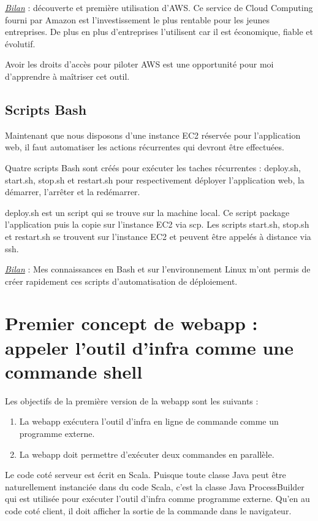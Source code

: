 \underline{\textit{Bilan}} : découverte et première utilisation d'AWS. Ce
service de Cloud Computing fourni par Amazon est l'investissement le plus
rentable pour les jeunes entreprises. De plus en plus d'entreprises l'utilisent
car il est économique, fiable et évolutif.

Avoir les droits d'accès pour piloter AWS est une opportunité pour moi
d'apprendre à maîtriser cet outil.

\subsection{Scripts Bash}

Maintenant que nous disposons d'une instance EC2 réservée pour l'application
web, il faut automatiser les actions récurrentes qui devront être effectuées.

Quatre scripts Bash sont créés pour exécuter les taches récurrentes :
deploy.sh, start.sh, stop.sh et restart.sh pour respectivement déployer
l'application web, la démarrer, l'arrêter et la redémarrer.

deploy.sh est un script qui se trouve sur la machine local.
Ce script package l'application puis la copie sur l'instance EC2 via scp.
Les scripts start.sh, stop.sh et restart.sh se trouvent sur l'instance EC2 et
peuvent être appelés à distance via ssh.

\underline{\textit{Bilan}} : Mes connaissances en Bash et sur l'environnement
Linux m'ont permis de créer rapidement ces scripts d'automatisation de
déploiement.

\section{Premier concept de webapp : appeler l'outil d'infra comme une commande
  shell}
\noindent Les objectifs de la première version de la webapp sont les suivants :
\begin{enumerate}
\item La webapp exécutera l'outil d'infra en ligne de commande comme un
  programme externe.
\item La webapp doit permettre d'exécuter deux commandes en parallèle.
\end{enumerate}

Le code coté serveur est écrit en Scala.
Puisque toute classe Java peut être naturellement instanciée dans du code Scala,
c'est la classe Java ProcessBuilder qui est utilisée pour exécuter
l'outil d'infra comme programme externe.
Qu'en au code coté client, il doit afficher la sortie de la commande dans le
navigateur.


